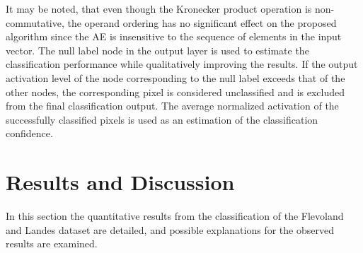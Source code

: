 It may be noted, that even though the Kronecker product operation is non-commutative, the operand ordering has no significant effect on the proposed algorithm since the AE is insensitive to the sequence of elements in the input vector. 
The null label node in the output layer is used to estimate the classification performance while qualitatively improving the results. If the output activation level of the node corresponding to the null label exceeds that of the other nodes, the corresponding pixel is considered unclassified and is excluded from the final classification output. The average normalized activation  of the successfully classified pixels is used as an estimation of the classification confidence. 








\section{Results and Discussion}
\label{sec:jameson}
In this section the quantitative results from the classification of the Flevoland and Landes dataset are detailed, and possible explanations for the observed results are examined. 

